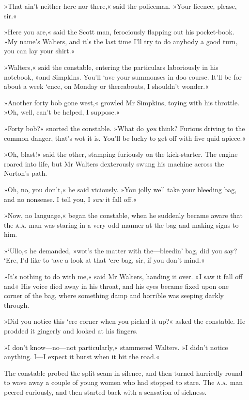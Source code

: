 »That ain't neither here nor there,« said the policeman. »Your licence, please, sir.«

»Here you are,« said the Scott man, ferociously flapping out his pocket-book. »My name's Walters, and it's the last time I'll try to do anybody a good turn, you can lay your shirt.«

»Walters,« said the constable, entering the particulars laboriously in his notebook, »and Simpkins. You'll `ave your summonses in doo course. It'll be for about a week `ence, on Monday or thereabouts, I shouldn't wonder.«

»Another forty bob gone west,« growled Mr Simpkins, toying with his throttle. »Oh, well, can't be helped, I suppose.«

»Forty bob?« snorted the constable. »What do \textit{you} think? Furious driving to the common danger, that's wot it is. You'll be lucky to get off with five quid apiece.«

»Oh, blast!« said the other, stamping furiously on the kick-starter. The engine roared into life, but Mr Walters dexterously swung his machine across the Norton's path.

»Oh, no, you don't,« he said viciously. »You jolly well take your bleeding bag, and no nonsense. I tell you, I \textit{saw} it fall off.«

»Now, no language,« began the constable, when he suddenly became aware that the \textsc{a.a.} man was staring in a very odd manner at the bag and making signs to him.

»`Ullo,« he demanded, »wot's the matter with the—bleedin' bag, did you say? `Ere, I'd like to `ave a look at that `ere bag, sir, if you don't mind.«

»It's nothing to do with me,« said Mr Walters, handing it over. »I saw it fall off and\longdash« His voice died away in his throat, and his eyes became fixed upon one corner of the bag, where something damp and horrible was seeping darkly through.

»Did you notice this `ere corner when you picked it up?« asked the constable. He prodded it gingerly and looked at his fingers.

»I don't know—no—not particularly,« stammered Walters. »I didn't notice anything. I—I expect it burst when it hit the road.«

The constable probed the split seam in silence, and then turned hurriedly round to wave away a couple of young women who had stopped to stare. The \textsc{a.a.} man peered curiously, and then started back with a sensation of sickness.

